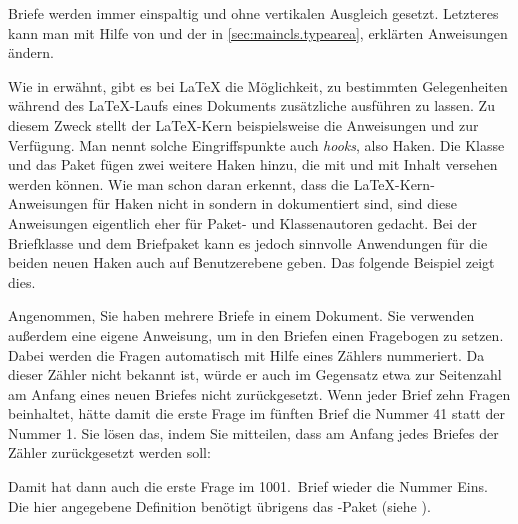 Briefe werden immer
einspaltig und ohne vertikalen Ausgleich gesetzt. Letzteres kann man mit Hilfe
von  und der in
\autoref{sec:maincls.typearea}, 
erklärten Anweisungen 
ändern.%
\EndIndexGroup


\begin{Declaration}
\end{Declaration}
\iftrue%
Wie in \cite{latex:clsguide} erwähnt,
gibt es bei \LaTeX{} die Möglichkeit, zu bestimmten Gelegenheiten während des
\LaTeX-Laufs eines Dokuments zusätzliche  ausführen zu
lassen. Zu diesem Zweck stellt der \LaTeX-Kern beispielsweise die Anweisungen
 und
 zur Verfügung. Man nennt
solche Eingriffspunkte auch \emph{hooks}, also
Haken. Die Klasse  und das Paket  fügen
zwei weitere Haken hinzu, die mit  und
 mit Inhalt versehen
werden können. Wie man schon daran erkennt, dass die \LaTeX-Kern-Anweisungen
für Haken nicht in \cite{latex:usrguide} sondern in \cite{latex:clsguide}
dokumentiert sind, sind diese Anweisungen eigentlich eher für Paket- und
Klassenautoren gedacht. Bei der Briefklasse und dem Briefpaket kann es jedoch
sinnvolle Anwendungen für die beiden neuen Haken auch auf Benutzerebene
geben. Das folgende Beispiel zeigt dies.%
%
\begin{Example}
  Angenommen, Sie haben mehrere Briefe in einem Dokument. Sie verwenden
  außerdem eine eigene Anweisung, um in den Briefen einen Fragebogen
  zu setzen. Dabei werden die Fragen automatisch mit Hilfe eines
  Zählers nummeriert. Da \KOMAScript{} dieser Zähler nicht bekannt
  ist, würde er auch im Gegensatz etwa zur Seitenzahl am Anfang eines
  neuen Briefes nicht zurückgesetzt. Wenn jeder Brief zehn Fragen
  beinhaltet, hätte damit die erste Frage im fünften Brief die Nummer
  41 statt der Nummer 1. Sie lösen das, indem Sie \KOMAScript{}
  mitteilen, dass am Anfang jedes Briefes der Zähler zurückgesetzt
  werden soll:
\begin{lstcode}
  \newcommand{\Frage}[1]{%
    \par
    \refstepcounter{Frage}%
    \noindent
    \begin{tabularx}{\textwidth}{l@{}X}
      \theFrage:~ & #1\\
    \end{tabularx}%
  }%
  \AtBeginLetter{\setcounter{Frage}{0}}
\end{lstcode}
  Damit hat dann auch die erste Frage im 1001.~Brief wieder die Nummer
  Eins. Die hier angegebene Definition benötigt übrigens das
  -Paket (siehe
  \cite{package:tabularx}).
\end{Example}
